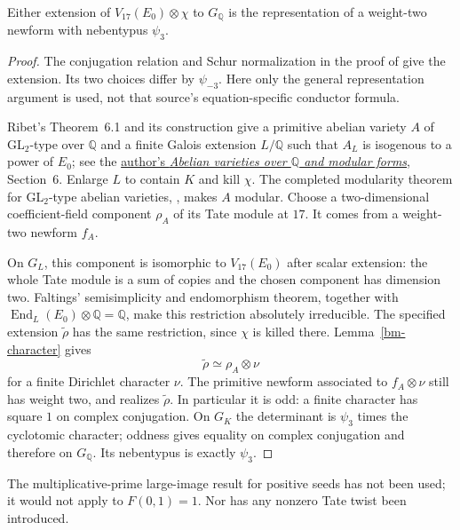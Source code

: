 \begin{theorem}
\label{bm-modular}
Either extension of $V_{17}(E_0)\otimes\chi$ to $G_{\mathbb Q}$
is the representation of a weight-two newform with nebentypus
$\psi_3$.
\end{theorem}
\begin{proof}
The conjugation relation and Schur normalization in the proof of
\cite[Theorem~4.2]{PacettiVillagra2022QCurves} give the extension.
Its two choices differ by $\psi_{-3}$. Here only the general
representation argument is used, not that source's equation-specific
conductor formula.

Ribet's Theorem~6.1 and its construction give a primitive abelian
variety $A$ of GL$_2$-type over $\mathbb Q$ and a finite Galois
extension $L/\mathbb Q$ such that $A_L$ is isogenous to a power of
$E_0$; see the
\href{https://math.berkeley.edu/~ribet/Articles/korea.pdf}{author's
\emph{Abelian varieties over $\mathbb Q$ and modular forms}},
Section~6. Enlarge $L$ to contain $K$ and kill $\chi$.
The completed modularity theorem for GL$_2$-type abelian varieties,
\cite[Corollary~10.2(i)]{KhareWintenberger2009Serre}, makes $A$
modular. Choose a two-dimensional coefficient-field component
$\rho_A$ of its Tate module at $17$. It comes from a weight-two
newform $f_A$.

On $G_L$, this component is isomorphic to $V_{17}(E_0)$ after
scalar extension: the whole Tate module is a sum of copies and the
chosen component has dimension two. Faltings' semisimplicity and
endomorphism theorem, together with
$\operatorname{End}_L(E_0)\otimes\mathbb Q=\mathbb Q$, make
this restriction absolutely irreducible. The specified extension
$\widetilde\rho$ has the same restriction, since $\chi$ is killed
there. Lemma~\ref{bm-character} gives
\[
 \widetilde\rho\simeq\rho_A\otimes\nu
\]
for a finite Dirichlet character $\nu$. The primitive newform
associated to $f_A\otimes\nu$ still has weight two, and realizes
$\widetilde\rho$. In particular it is odd: a finite character
has square $1$ on complex conjugation. On $G_K$ the determinant
is $\psi_3$ times the cyclotomic character; oddness gives equality
on complex conjugation and therefore on $G_{\mathbb Q}$. Its
nebentypus is exactly $\psi_3$.
\end{proof}

The multiplicative-prime large-image result for positive seeds has
not been used; it would not apply to $F(0,1)=1$. Nor has any
nonzero Tate twist been introduced.

